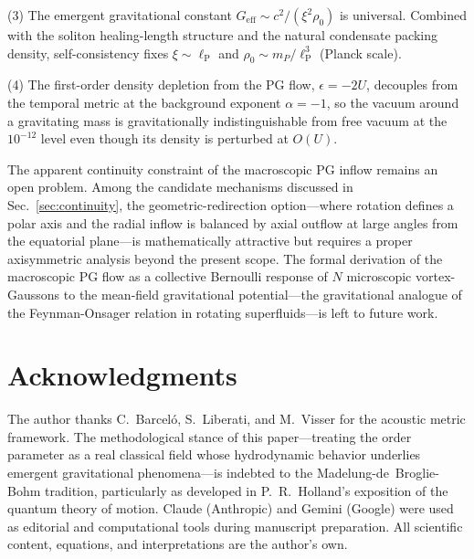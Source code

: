 \documentclass[12pt, a4paper]{article}
\newcommand{\Geff}{G_{\mathrm{eff}}}
\newcommand{\lP}{\ell_{\mathrm{P}}}
\begin{document}
(3) The emergent gravitational constant $\Geff \sim c^2/(\xi^2\rho_0)$ is universal. Combined with the soliton healing-length structure and the natural condensate packing density, self-consistency fixes $\xi \sim \lP$ and $\rho_0 \sim m_P/\lP^3$ (Planck scale).

(4) The first-order density depletion from the PG flow, $\epsilon = -2U$, decouples from the temporal metric at the background exponent $\alpha = -1$, so the vacuum around a gravitating mass is gravitationally indistinguishable from free vacuum at the $10^{-12}$ level even though its density is perturbed at $O(U)$.

The apparent continuity constraint of the macroscopic PG inflow remains an open problem. Among the candidate mechanisms discussed in Sec.~\ref{sec:continuity}, the geometric-redirection option---where rotation defines a polar axis and the radial inflow is balanced by axial outflow at large angles from the equatorial plane---is mathematically attractive but requires a proper axisymmetric analysis beyond the present scope. The formal derivation of the macroscopic PG flow as a collective Bernoulli response of $N$ microscopic vortex-Gaussons to the mean-field gravitational potential---the gravitational analogue of the Feynman-Onsager relation in rotating superfluids---is left to future work.


\section*{Acknowledgments}

The author thanks C.~Barcel\'{o}, S.~Liberati, and M.~Visser for the acoustic metric framework. The methodological stance of this paper---treating the order parameter as a real classical field whose hydrodynamic behavior underlies emergent gravitational phenomena---is indebted to the Madelung-de~Broglie-Bohm tradition, particularly as developed in P.~R.~Holland's exposition of the quantum theory of motion. Claude (Anthropic) and Gemini (Google) were used as editorial and computational tools during manuscript preparation. All scientific content, equations, and interpretations are the author's own.
\end{document}
